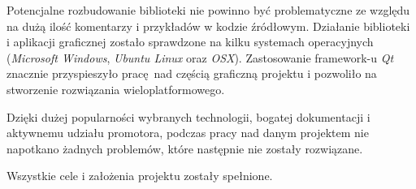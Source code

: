 \documentclass[eng,printmode]{mgr}
\begin{document}
Potencjalne rozbudowanie biblioteki nie powinno być problematyczne ze względu na dużą ilość komentarzy i przykładów w kodzie źródłowym. Działanie biblioteki i aplikacji graficznej zostało sprawdzone na kilku systemach operacyjnych (\emph{Microsoft Windows}, \emph{Ubuntu Linux} oraz \emph{OSX}). Zastosowanie framework-u \emph{Qt} znacznie przyspieszyło pracę nad częścią graficzną projektu i pozwoliło na stworzenie rozwiązania wieloplatformowego.

Dzięki dużej popularności wybranych technologii, bogatej dokumentacji i aktywnemu udziału promotora, podczas pracy nad danym projektem nie napotkano żadnych problemów, które następnie nie zostały rozwiązane.

Wszystkie cele i założenia projektu zostały spełnione.

\listoffigures
\nocite{*}

\end{document}
